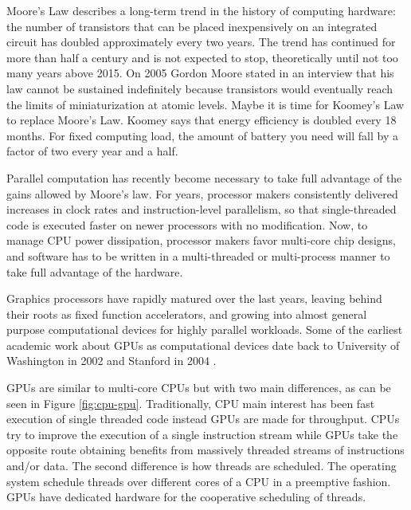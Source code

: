 \documentclass[review]{elsarticle}
\begin{document}
Moore's Law describes a long-term trend in the history of computing
hardware: the number of transistors that can be placed inexpensively
on an integrated circuit has doubled approximately every two
years. The trend has continued for more than half a century and is not
expected to stop, theoretically until not too many years above
2015. On 2005 Gordon Moore stated in an interview that his law cannot
be sustained indefinitely because transistors would eventually reach
the limits of miniaturization at atomic levels. Maybe it is time for
Koomey's Law \cite{10.1109/MAHC.2010.28} to replace Moore's
Law. Koomey says that energy efficiency is doubled every 18
months. For fixed computing load, the amount of battery you need will
fall by a factor of two every year and a half.

Parallel computation has recently become necessary to take full
advantage of the gains allowed by Moore's law. For years, processor
makers consistently delivered increases in clock rates and
instruction-level parallelism, so that single-threaded code is
executed faster on newer processors with no modification. Now, to
manage CPU power dissipation, processor makers favor multi-core chip
designs, and software has to be written in a multi-threaded or
multi-process manner to take full advantage of the hardware. %

Graphics processors have rapidly matured over the last years, leaving
behind their roots as fixed function accelerators, and growing into
almost general purpose computational devices for highly parallel
workloads. Some of the earliest academic work about GPUs as
computational devices date back to University of Washington in 2002
\cite{Thompson:2002:UMG:774861.774894} and Stanford in 2004
\cite{Buck:2004:BGS:1015706.1015800}.  %

GPUs are similar to multi-core CPUs but with two main differences,
as can be seen in Figure \ref{fig:cpu-gpu}. Traditionally, CPU
main interest has been fast execution of single threaded code instead
GPUs are made for throughput. CPUs try to improve the execution of a
single instruction stream while GPUs take the opposite route obtaining
benefits from massively threaded streams of instructions and/or
data. The second difference is how threads are scheduled. The
operating system schedule threads over different cores of a CPU in a
preemptive fashion. GPUs have dedicated hardware for the cooperative
scheduling of threads. 
\end{document}
